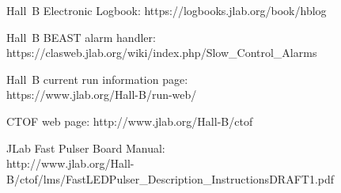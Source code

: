 \documentclass[12pt]{article}
\begin{document}
\clearpage

\vfil
\eject

\begin{thebibliography}{99}

Hall~B Electronic Logbook: https://logbooks.jlab.org/book/hblog

Hall~B BEAST alarm handler: \\
https://clasweb.jlab.org/wiki/index.php/Slow\_Control\_Alarms

Hall~B current run information page:\\
https://www.jlab.org/Hall-B/run-web/

CTOF web page: http://www.jlab.org/Hall-B/ctof

JLab Fast Pulser Board Manual:\\
http://www.jlab.org/Hall-B/ctof/lms/FastLEDPulser\_Description\_InstructionsDRAFT1.pdf 

\end{thebibliography}
\end{document}
